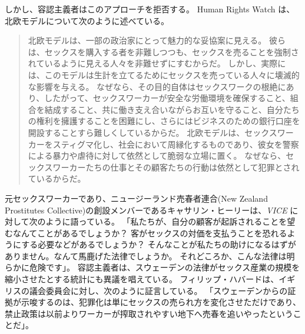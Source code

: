 \documentclass[paper=a4,book,openany]{jlreq} \usepackage{mystyle}
\begin{document}
しかし、容認主義者はこのアプローチを拒否する。
Human Rights Watch は、北欧モデルについて次のように述べている。

\begin{quote}
北欧モデルは、一部の政治家にとって魅力的な妥協案に見える。
彼らは、セックスを購入する者を非難しつつも、セックスを売ることを強制されているように見える人々を非難せずにすむからだ。
しかし、実際には、このモデルは生計を立てるためにセックスを売っている人々に壊滅的な影響を与える。
なぜなら、その目的自体はセックスワークの根絶にあり、したがって、セックスワーカーが安全な労働環境を確保すること、組合を結成すること、共に働き支え合いながらお互いを守ること、自分たちの権利を擁護することを困難にし、さらにはビジネスのための銀行口座を開設することすら難しくしているからだ。
北欧モデルは、セックスワーカーをスティグマ化し、社会において周縁化するものであり、彼女を警察による暴力や虐待に対して依然として脆弱な立場に置く。
なぜなら、セックスワーカーたちの仕事とその顧客たちの行動は依然として犯罪とされているからだ。
\citep{watch19:_why_sex_work_shoul_be_decrim}
\end{quote}

元セックスワーカーであり、ニュージーランド売春者連合(New Zealand Prostitutes Collective)の創設メンバーであるキャサリン・ヒーリーは、\emph{VICE} に対して次のように語っている。
「私たちが、自分の顧客が起訴されることを望むなんてことがあるでしょうか？ 客がセックスの対価を支払うことを恐れるようにする必要などがあるでしょうか？ そんなことが私たちの助けになるはずがありません。なんて馬鹿げた法律でしょうか。
それどころか、こんな法律は明らかに危険です」\citep{mcclure17:_what_happen_when_sex_worker}。
容認主義者は、スウェーデンの法律がセックス産業の規模を縮小させたとする統計にも異議を唱えている。
フィリップ・ハバードは、イギリスの議会委員会に対し、次のように証言している。
「スウェーデンからの証拠が示唆するのは、犯罪化は単にセックスの売られ方を変化させただけであり、禁止政策は以前よりワーカーが搾取されやすい地下へ売春を追いやったということだ」\citep[p.25]{commons16:_prost}。
\end{document}
